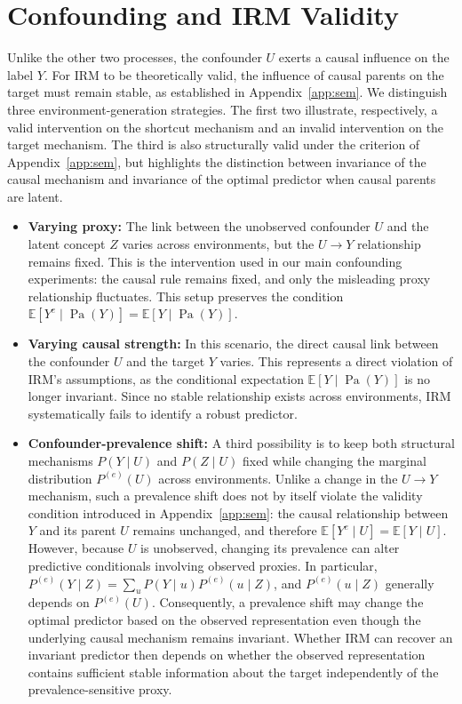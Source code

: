 \documentclass[11pt]{article}
\theoremstyle{definition}
\theoremstyle{plain}
\begin{document}
\section{Confounding and IRM Validity}
\label{app:confounding-validity}

Unlike the other two processes, the confounder $U$ exerts a causal influence on the label $Y$. For IRM to be theoretically valid, the influence of causal parents on the target must remain stable, as established in Appendix~\ref{app:sem}. We distinguish three environment-generation strategies. The first two illustrate, respectively, a valid intervention on the shortcut mechanism and an invalid intervention on the target mechanism. The third is also structurally valid under the criterion of Appendix~\ref{app:sem}, but highlights the distinction between invariance of the causal mechanism and invariance of the optimal predictor when causal parents are latent.

\begin{itemize}
    \item \textbf{Varying proxy:} The link between the unobserved confounder $U$ and the latent concept $Z$ varies across environments, but the $U \rightarrow Y$ relationship remains fixed. This is the intervention used in our main confounding experiments: the causal rule remains fixed, and only the misleading proxy relationship fluctuates. This setup preserves the condition $\mathbb{E}[Y^e \mid \operatorname{Pa}(Y)] = \mathbb{E}[Y \mid \operatorname{Pa}(Y)]$.
    \item \textbf{Varying causal strength:} In this scenario, the direct causal link between the confounder $U$ and the target $Y$ varies. This represents a direct violation of IRM's assumptions, as the conditional expectation $\mathbb{E}[Y \mid \operatorname{Pa}(Y)]$ is no longer invariant. Since no stable relationship exists across environments, IRM systematically fails to identify a robust predictor.
    \item \textbf{Confounder-prevalence shift:} A third possibility is to keep both structural mechanisms \(P(Y\mid U)\) and \(P(Z\mid U)\) fixed while changing the marginal distribution \(P^{(e)}(U)\) across environments. Unlike a change in the \(U\rightarrow Y\) mechanism, such a prevalence shift does not by itself violate the validity condition introduced in Appendix~\ref{app:sem}: the causal relationship between \(Y\) and its parent \(U\) remains unchanged, and therefore \(\mathbb{E}[Y^{e}\mid U]=\mathbb{E}[Y\mid U]\). However, because \(U\) is unobserved, changing its prevalence can alter predictive conditionals involving observed proxies. In particular, $P^{(e)}(Y\mid Z) = \sum_u P(Y\mid u)P^{(e)}(u\mid Z)$, and \(P^{(e)}(u\mid Z)\) generally depends on \(P^{(e)}(U)\). Consequently, a prevalence shift may change the optimal predictor based on the observed representation even though the underlying causal mechanism remains invariant. Whether IRM can recover an invariant predictor then depends on whether the observed representation contains sufficient stable information about the target independently of the prevalence-sensitive proxy.
\end{itemize}
\end{document}
